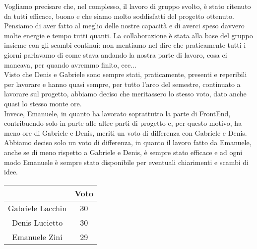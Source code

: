 \documentclass{article}
\begin{document}
Vogliamo precisare che, nel complesso, il lavoro di gruppo svolto, è stato ritenuto da tutti efficace, buono e che siamo molto soddisfatti del progetto ottenuto. Pensiamo di aver fatto al meglio delle nostre capacità e di averci speso davvero molte energie e tempo tutti quanti. La collaborazione è stata alla base del gruppo insieme con gli scambi continui: non mentiamo nel dire che praticamente tutti i giorni parlavamo di come stava andando la nostra parte di lavoro, cosa ci mancava, per quando avremmo finito, ecc... \\
Visto che Denis e Gabriele sono sempre stati, praticamente, presenti e reperibili per lavorare e hanno quasi sempre, per tutto l'arco del semestre, continuato a lavorare sul progetto, abbiamo deciso che meritassero lo stesso voto, dato anche quasi lo stesso monte ore. \\
Invece, Emanuele, in quanto ha lavorato soprattutto la parte di FrontEnd, contribuendo solo in parte alle altre parti di progetto e, per questo motivo, ha meno ore di Gabriele e Denis, meriti un voto di differenza con Gabriele e Denis. Abbiamo deciso solo un voto di differenza, in quanto il lavoro fatto da Emanuele, anche se di meno rispetto a Gabriele e Denis, è sempre stato efficace e ad ogni modo Emanuele è sempre stato disponibile per eventuali chiarimenti e scambi di idee.

\begin{center}
    \begin{tabular}{|c|c|}
        \hline
                         & Voto \\
        \hline
        Gabriele Lacchin & 30   \\
        \hline
        Denis Lucietto   & 30   \\
        \hline
        Emanuele Zini    & 29   \\
        \hline
    \end{tabular}
\end{center}
\end{document}
